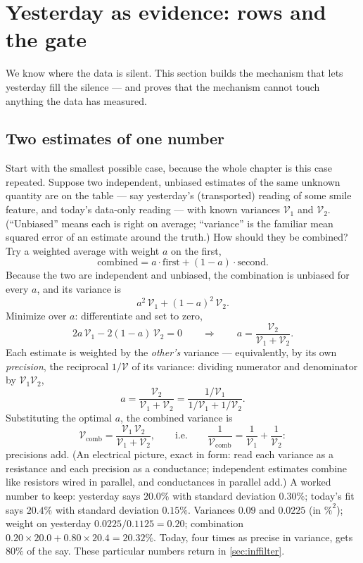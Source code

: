 \section{Yesterday as evidence: rows and the gate}
\label{sec:infgate}

We know where the data is silent.  This section builds the mechanism
that lets yesterday fill the silence --- and proves that the
mechanism cannot touch anything the data has measured.

\subsection{Two estimates of one number}
\label{sec:infcombine}

Start with the smallest possible case, because the whole chapter is
this case repeated.  Suppose two independent, unbiased estimates of
the same unknown quantity are on the table --- say yesterday's
(transported) reading of some smile feature, and today's data-only
reading --- with known variances $\mathcal{V}_1$ and $\mathcal{V}_2$.
(``Unbiased'' means each is right on average; ``variance'' is the
familiar mean squared error of an estimate around the truth.)  How
should they be combined?  Try a weighted average with weight $a$ on
the first,
\[
\text{combined}=a\cdot\text{first}+(1-a)\cdot\text{second}.
\]
Because the two are independent and unbiased, the combination is
unbiased for every $a$, and its variance is
\[
a^2\,\mathcal{V}_1+(1-a)^2\,\mathcal{V}_2 .
\]
Minimize over $a$: differentiate and set to zero,
\[
2a\,\mathcal{V}_1-2(1-a)\,\mathcal{V}_2=0
\qquad\Longrightarrow\qquad
a=\frac{\mathcal{V}_2}{\mathcal{V}_1+\mathcal{V}_2}.
\]
Each estimate is weighted by the \emph{other's} variance ---
equivalently, by its own \emph{precision}, the reciprocal
$1/\mathcal{V}$ of its variance: dividing numerator and denominator
by $\mathcal{V}_1\mathcal{V}_2$,
\[
a=\frac{\mathcal{V}_2}{\mathcal{V}_1+\mathcal{V}_2}
=\frac{1/\mathcal{V}_1}{1/\mathcal{V}_1+1/\mathcal{V}_2}.
\]  Substituting the optimal $a$, the combined variance is
\begin{equation}
\mathcal{V}_{\mathrm{comb}}
=\frac{\mathcal{V}_1\,\mathcal{V}_2}{\mathcal{V}_1+\mathcal{V}_2},
\qquad\text{i.e.}\qquad
\frac{1}{\mathcal{V}_{\mathrm{comb}}}
=\frac{1}{\mathcal{V}_1}+\frac{1}{\mathcal{V}_2}:
\label{eq:infprecadd}
\end{equation}
precisions add.  (An electrical picture, exact in form: read each
variance as a resistance and each precision as a conductance;
independent estimates combine like resistors wired in parallel, and
conductances in parallel add.)  A worked number to keep: yesterday says $20.0\%$
with standard deviation $0.30\%$; today's fit says $20.4\%$ with
standard deviation $0.15\%$.  Variances $0.09$ and $0.0225$ (in
$\%^2$); weight on yesterday $0.0225/0.1125=0.20$; combination
$0.20\times20.0+0.80\times20.4=20.32\%$.  Today, four times as
precise in variance, gets $80\%$ of the say.  These particular
numbers return in \cref{sec:inffilter}.

